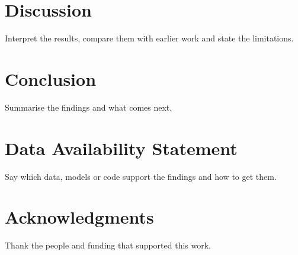 \documentclass[Journal,letterpaper]{ascelike}
\begin{document}
\section{Discussion}
Interpret the results, compare them with earlier work and state the limitations.

\section{Conclusion}
Summarise the findings and what comes next.

\section{Data Availability Statement}
Say which data, models or code support the findings and how to get them.

\section*{Acknowledgments}
Thank the people and funding that supported this work.


\end{document}
